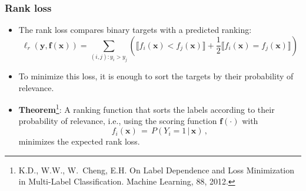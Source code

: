 \documentclass[]{beamer}
\renewcommand{\Pr}{P}
\renewcommand{\vec}[1]{\boldsymbol{#1}}
\renewcommand{\emph}[1]{\textbf{\color{putblue}#1}}
\begin{document}
\begin{frame}
\frametitle{Rank loss}
\begin{itemize}
\item
The rank loss compares binary targets with a predicted ranking:
$$
\ell_r(\vec{y},\boldsymbol{f}(\vec{x})) = \sum_{(i,j): y_i > y_j}  \left (\llbracket f_i(\vec{x}) < f_j(\vec{x}) \rrbracket + \frac{1}{2} \llbracket f_i(\vec{x}) = f_j(\vec{x}) \rrbracket  \right )
$$

\item
To minimize this loss, it is enough to sort the targets by their probability of relevance. 

\item
\emph{Theorem}\footnote{K.D., W.W., W.\ Cheng, E.H. On Label Dependence and Loss Minimization in Multi-Label Classification. Machine Learning, 88, 2012.}: A ranking function that sorts the labels according to their probability of relevance, i.e., using the scoring
function $\boldsymbol{f}(\cdot)$ with
$$
f_i(\vec{x}) \, = \, \Pr(Y_i = 1 \, | \, \vec{x}) \,,
$$
minimizes the expected rank loss.
\end{itemize}

\end{frame}


\end{document}
